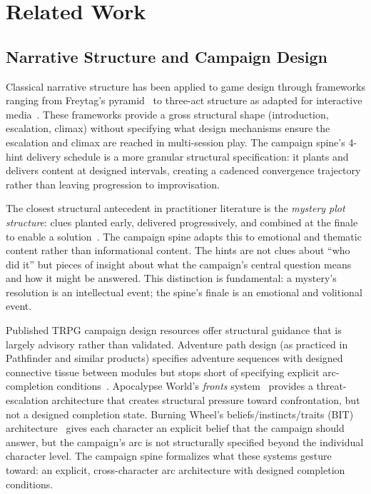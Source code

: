 
\section{Related Work}
\label{sec:related}

\subsection{Narrative Structure and Campaign Design}

Classical narrative structure has been applied to game design through frameworks
ranging from Freytag's pyramid~\cite{campbell1949hero} to three-act structure as
adapted for interactive media~\cite{ryan2017narrative}. These frameworks provide
a gross structural shape (introduction, escalation, climax) without specifying what
design mechanisms ensure the escalation and climax are reached in multi-session play.
The campaign spine's 4-hint delivery schedule is a more granular structural
specification: it plants and delivers content at designed intervals, creating a
cadenced convergence trajectory rather than leaving progression to improvisation.

The closest structural antecedent in practitioner literature is the \textit{mystery
plot structure}: clues planted early, delivered progressively, and combined at the
finale to enable a solution~\cite{mystery2012}. The campaign spine adapts this to
emotional and thematic content rather than informational content. The hints are not
clues about ``who did it'' but pieces of insight about what the campaign's central
question means and how it might be answered. This distinction is fundamental: a
mystery's resolution is an intellectual event; the spine's finale is an
emotional and volitional event.

Published TRPG campaign design resources offer structural guidance that is
largely advisory rather than validated. Adventure path design (as practiced in
Pathfinder and similar products) specifies adventure sequences with designed
connective tissue between modules but stops short of specifying explicit
arc-completion conditions~\cite{paizo2021}. Apocalypse World's \textit{fronts}
system~\cite{baker2010} provides a threat-escalation architecture that creates
structural pressure toward confrontation, but not a designed completion state.
Burning Wheel's beliefs/instincts/traits (BIT) architecture~\cite{crane2002}
gives each character an explicit belief that the campaign should answer, but
the campaign's arc is not structurally specified beyond the individual
character level. The campaign spine formalizes what these systems gesture toward:
an explicit, cross-character arc architecture with designed completion conditions.

